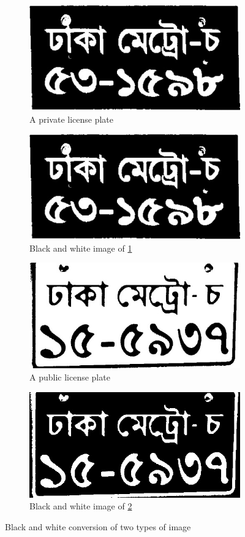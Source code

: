\documentclass{standalone}
\begin{document}
\begin{figure}
\begin{subfigure}{.5\textwidth}
  \centering
  \includegraphics[width=.8\linewidth]{./img/sample/bnw-1.jpg}
  \caption{A private license plate}
  \label{fig:PrivatePlate}
\end{subfigure}
\begin{subfigure}{.5\textwidth}
  \centering
  \includegraphics[width=.8\linewidth]{./img/sample/bnw-2.jpg}
  \caption{Black and white image of \ref{fig:PrivatePlate}}
\end{subfigure}
\begin{subfigure}{.5\textwidth}
  \centering
  \includegraphics[width=.8\linewidth]{./img/sample/bnw-3.jpg}
  \caption{A public license plate}
  \label{fig:PublicPlate}
\end{subfigure}
\begin{subfigure}{.5\textwidth}
  \centering
  \includegraphics[width=.8\linewidth]{./img/sample/bnw-4.jpg}
  \caption{Black and white image of \ref{fig:PublicPlate}}
\end{subfigure}
\caption{Black and white conversion of two types of image}
\label{fig:BlackAndWhite}
\end{figure}
\end{document}
